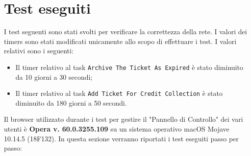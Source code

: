 \documentclass[../Relazione.tex]{subfiles}
\begin{document}
\section{Test eseguiti}
    I test seguenti sono stati svolti per verificare la correttezza della rete. I valori dei timers sono stati modificati unicamente allo scopo di effettuare i test. I valori relativi sono i seguenti:
    \begin{itemize}
        \item Il timer relativo al task \texttt{Archive The Ticket As Expired} è stato diminuito da 10 giorni a 30 secondi;
        \item Il timer relativo al task \texttt{Add Ticket For Credit Collection} è stato diminuito da 180 giorni a 50 secondi.
    \end{itemize}
    Il browser utilizzato durante i test per gestire il "Pannello di Controllo" dei vari utenti è \textbf{Opera v. 60.0.3255.109} su un sistema operativo macOS Mojave 10.14.5 (18F132).
    In questa sezione verranno riportati i test eseguiti passo per passo:
\end{document}
